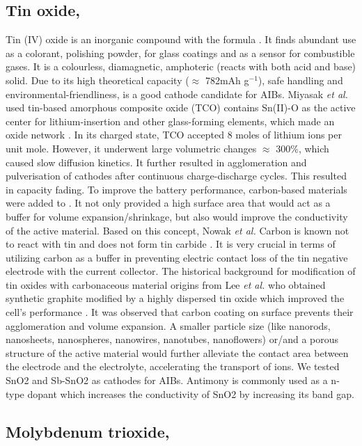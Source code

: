 \subsection*{Tin oxide, }
Tin (IV) oxide is an inorganic compound with the formula . It finds abundant use as a colorant, polishing powder, for glass coatings and as a sensor for combustible gases. It is a colourless, diamagnetic, amphoteric (reacts with both acid and base) solid. Due to its high theoretical capacity ($\approx$ 782mAh g$^{-1}$), safe handling and environmental-friendliness,  is a good cathode candidate for AIBs. Miyasak \textit{et al.} used tin-based amorphous composite oxide (TCO) contains Sn(II)-O as the active center for lithium-insertion and other glass-forming elements, which made an oxide network \cite{idota_tin-based_1997}. In its charged state, TCO accepted 8 moles of lithium ions per unit mole. However, it underwent large volumetric changes $\approx$ 300{\%}, which caused slow diffusion kinetics. It further resulted in agglomeration and pulverisation of cathodes after continuous charge-discharge cycles. This resulted in capacity fading. To improve the battery performance, carbon-based materials were added to . It not only provided a high surface area that would act as a buffer for volume expansion/shrinkage, but also would improve the conductivity of the active material. Based on this concept, Nowak \textit{et al.} \cite{nowak_composites_2018}
Carbon is known not to react with tin and does not form tin carbide \cite{}. It is very crucial in terms of utilizing carbon as a buffer in preventing electric contact loss of the tin negative electrode with the current collector\cite{}. The historical background for modification of tin oxides with carbonaceous material origins from Lee \textit{et al.} who obtained synthetic graphite modified by a highly dispersed tin oxide which improved the cell's performance \cite{navarro-suarez_2d_nodate}. 
It was observed that carbon coating on  surface prevents their agglomeration and volume expansion. A smaller particle size (like nanorods\cite{}, nanosheets\cite{}, nanospheres\cite{}, nanowires\cite{}, nanotubes\cite{}, nanoflowers\cite{}) or/and a porous structure of the active material would further alleviate the contact area between the electrode and the electrolyte, accelerating the transport of ions. 
We tested SnO2 and Sb-SnO2 as cathodes for AIBs. Antimony is commonly used as a n-type dopant which increases the conductivity of SnO2 by increasing its band gap. 
\subsection*{Molybdenum trioxide, }

